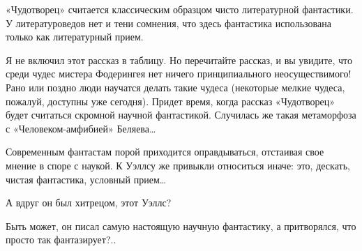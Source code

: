 «Чудотворец»   считается   классическим   образцом   чисто    литературной
фантастики. У литературоведов  нет и тени  сомнения, что здесь  фантастика
использована только как литературный прием.

Я не включил этот рассказ в таблицу. Но перечитайте рассказ, и вы увидите,
что  среди   чудес   мистера   Фодерингея   нет   ничего   принципиального
неосуществимого!  Рано  или  поздно  люди  научатся  делать  такие  чудеса
(некоторые мелкие чудеса,  пожалуй, доступны уже  сегодня). Придет  время,
когда рассказ «Чудотворец» будет  считаться скромной научной  фантастикой.
Случилась же такая метаморфоза с «Человеком-амфибией» Беляева…

Современным  фантастам  порой  приходится  оправдываться,  отстаивая  свое
мнение в  споре с  наукой. К  Уэллсу же  привыкли относиться  иначе:  это,
дескать, чистая фантастика, условный прием…

А вдруг он был хитрецом, этот Уэллс?

Быть   может,  он   писал  самую   настоящую  научную   фантастику,  а
притворялся, что просто так фантазирует?..
